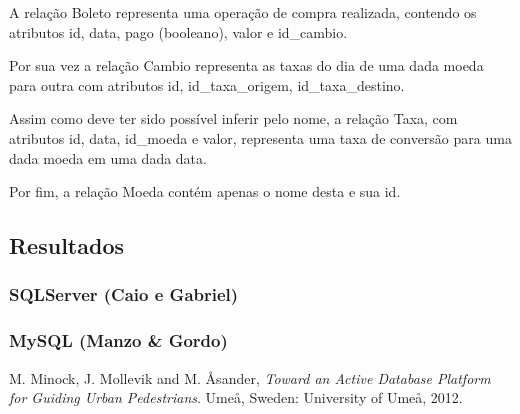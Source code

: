 \documentclass[conference]{IEEEtran}
\begin{document}
    A relação Boleto representa uma operação de compra realizada, contendo os atributos id, data, pago (booleano), valor e id\_cambio.

    Por sua vez a relação Cambio representa as taxas do dia de uma dada moeda para outra com atributos id, id\_taxa\_origem, id\_taxa\_destino.

    Assim como deve ter sido possível inferir pelo nome, a relação Taxa, com atributos id, data, id\_moeda e valor, representa uma taxa de conversão para uma dada moeda em uma dada data.

    Por fim, a relação Moeda contém apenas o nome desta e sua id.

  \subsection{Resultados}
    \subsubsection{SQLServer (Caio e Gabriel)}
    \subsubsection{MySQL (Manzo \& Gordo)}


\begin{thebibliography}{1}

M. Minock, J. Mollevik and M. \r{A}sander, \textit{Toward an Active Database Platform for Guiding Urban Pedestrians}. Ume\r{a}, Sweden: University of Ume\r{a}, 2012.

\end{thebibliography}
\end{document}
